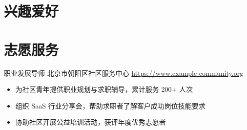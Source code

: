 \documentclass[a4paper, serif, 10pt]{moderncv}
\begin{document}
\section{兴趣爱好}

\section{志愿服务}

        {职业发展导师}
        {北京市朝阳区社区服务中心}
        {\url{https://www.example-community.org}}
        {}
        {\begin{itemize}
\item 为社区青年提供职业规划与求职辅导，累计服务 200+ 人次
\item 组织 SaaS 行业分享会，帮助求职者了解客户成功岗位技能要求
\item 协助社区开展公益培训活动，获评年度优秀志愿者
\end{itemize}}
    
\end{document}
